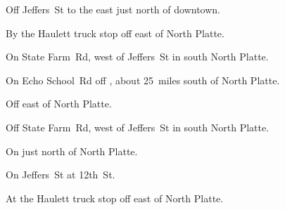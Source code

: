 
\begin{LocationList}

Off  Jeffers~St to the east just north of downtown.

\Location{\GarageHQ \Garage}
By the Haulett truck stop off   east of North Platte.

On State Farm~Rd, west of  Jeffers~St in south North Platte.

On Echo School~Rd off , about 25~miles south of North Platte.

Off   east of North Platte.

Off State Farm~Rd, west of  Jeffers~St in south North Platte.

On  just north of North Platte.

On  Jeffers~St at  12th~St.

At the Haulett truck stop off   east of North Platte.

\end{LocationList}

